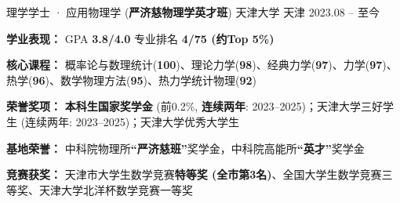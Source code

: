 

\begin{cventries}

\cventry
  {理学学士 · 应用物理学 (\textbf{严济慈物理学英才班})} %
  {天津大学} 
  {天津} 
  {2023.08 -- 至今} 
  {
    \begin{cvitems}
      \item {\textbf{学业表现：} GPA \textbf{3.8/4.0} \quad 专业排名 \textbf{4/75 (约Top 5\%)}} 
      \item {\textbf{核心课程：} 概率论与数理统计(\textbf{100})、理论力学(\textbf{98})、经典力学(\textbf{97})、力学(\textbf{97})、热学(\textbf{96})、数学物理方法(\textbf{95})、热力学统计物理(\textbf{92})} 
      \item {\textbf{荣誉奖项：} \textbf{本科生国家奖学金} (前0.2\%, \textbf{连续两年}: 2023--2025)；天津大学三好学生 (连续两年: 2023--2025)；天津大学优秀大学生} 
      \item {\textbf{基地荣誉：} 中科院物理所\textbf{“严济慈班”}奖学金，中科院高能所\textbf{“英才”}奖学金}
       \item {\textbf{竞赛获奖：} 天津市大学生数学竞赛\textbf{特等奖 (全市第3名)}、全国大学生数学竞赛三等奖、天津大学北洋杯数学竞赛一等奖}
    \end{cvitems}
  }

\end{cventries}
